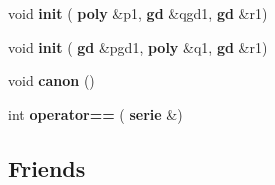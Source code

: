 \begin{DoxyCompactItemize}
\item 
\mbox{\label{classmmgd_1_1serie_a1485f36c62d4a6d3c5861c12219d28e2}} 
void {\bfseries init} (\textbf{ poly} \&p1, \textbf{ gd} \&qgd1, \textbf{ gd} \&r1)
\item 
\mbox{\label{classmmgd_1_1serie_a63454c770de7d4ee7f0216c21183574b}} 
void {\bfseries init} (\textbf{ gd} \&pgd1, \textbf{ poly} \&q1, \textbf{ gd} \&r1)
\item 
\mbox{\label{classmmgd_1_1serie_a37939ffcb52ec8f82a45c54e34b8d3fe}} 
void {\bfseries canon} ()
\item 
\mbox{\label{classmmgd_1_1serie_a1d28f3f8c8f4a4f5e7b3cf17102faf25}} 
int {\bfseries operator==} (\textbf{ serie} \&)
\end{DoxyCompactItemize}
\subsection*{Friends}
